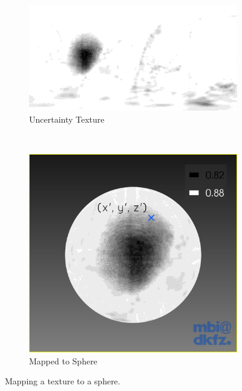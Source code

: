 \begin{figure}[H]
  \centering
  \begin{subfigure}[b]{0.5\textwidth}
    \includegraphics[width=\textwidth]{images/surface/texture_texture.png}
    \caption{Uncertainty Texture}
    \label{fig:texturetexture}
  \end{subfigure}%
  ~ %
  \begin{subfigure}[b]{0.5\textwidth}
    \includegraphics[width=\textwidth]{images/surface/texture_sphere.png}
    \caption{Mapped to Sphere}
    \label{fig:texturesphere}
  \end{subfigure}
  \caption{Mapping a texture to a sphere.}\label{fig:uncertaintytexture}
\end{figure}

